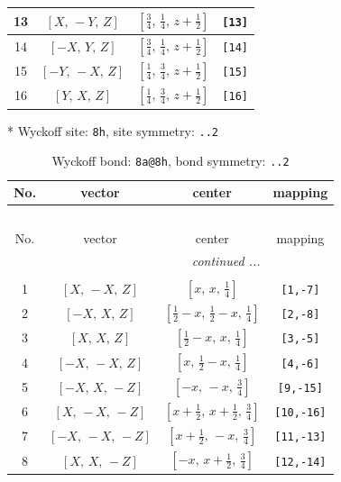\documentclass[fleqn,8pt]{jsarticle}
\begin{document}
\begin{longtable}{cccc}
13 & $\left[ X,\, - Y,\, Z \right]$ & $\left[ \frac{3}{4},\, \frac{1}{4},\, z + \frac{1}{2} \right]$ & {\tt [13]} \\ \hline
14 & $\left[ - X,\, Y,\, Z \right]$ & $\left[ \frac{3}{4},\, \frac{1}{4},\, z + \frac{1}{2} \right]$ & {\tt [14]} \\ \hline
15 & $\left[ - Y,\, - X,\, Z \right]$ & $\left[ \frac{1}{4},\, \frac{3}{4},\, z + \frac{1}{2} \right]$ & {\tt [15]} \\ \hline
16 & $\left[ Y,\, X,\, Z \right]$ & $\left[ \frac{1}{4},\, \frac{3}{4},\, z + \frac{1}{2} \right]$ & {\tt [16]} \\
\end{longtable}
* Wyckoff site: {\tt 8h}, site symmetry: {\tt ..2}
\renewcommand{\arraystretch}{1.2}
\begin{longtable}{cccc}
\caption{Wyckoff bond: {\tt 8a@8h}, bond symmetry: {\tt ..2}}
 \\
 \hline \hline
No. & vector & center & mapping \\ \hline \endfirsthead

\multicolumn{3}{l}{\tablename\ \thetable{}} \\
 \hline \hline
No. & vector & center & mapping \\ \hline \endhead

 \hline \hline
\multicolumn{3}{r}{\footnotesize\it continued ...} \\ \endfoot

 \hline \hline
\multicolumn{3}{r}{} \\ \endlastfoot

1 & $\left[ X,\, - X,\, Z \right]$ & $\left[ x,\, x,\, \frac{1}{4} \right]$ & {\tt [1,-7]} \\ \hline
2 & $\left[ - X,\, X,\, Z \right]$ & $\left[ \frac{1}{2} - x,\, \frac{1}{2} - x,\, \frac{1}{4} \right]$ & {\tt [2,-8]} \\ \hline
3 & $\left[ X,\, X,\, Z \right]$ & $\left[ \frac{1}{2} - x,\, x,\, \frac{1}{4} \right]$ & {\tt [3,-5]} \\ \hline
4 & $\left[ - X,\, - X,\, Z \right]$ & $\left[ x,\, \frac{1}{2} - x,\, \frac{1}{4} \right]$ & {\tt [4,-6]} \\ \hline
5 & $\left[ - X,\, X,\, - Z \right]$ & $\left[ - x,\, - x,\, \frac{3}{4} \right]$ & {\tt [9,-15]} \\ \hline
6 & $\left[ X,\, - X,\, - Z \right]$ & $\left[ x + \frac{1}{2},\, x + \frac{1}{2},\, \frac{3}{4} \right]$ & {\tt [10,-16]} \\ \hline
7 & $\left[ - X,\, - X,\, - Z \right]$ & $\left[ x + \frac{1}{2},\, - x,\, \frac{3}{4} \right]$ & {\tt [11,-13]} \\ \hline
8 & $\left[ X,\, X,\, - Z \right]$ & $\left[ - x,\, x + \frac{1}{2},\, \frac{3}{4} \right]$ & {\tt [12,-14]} \\
\end{longtable}
\end{document}
